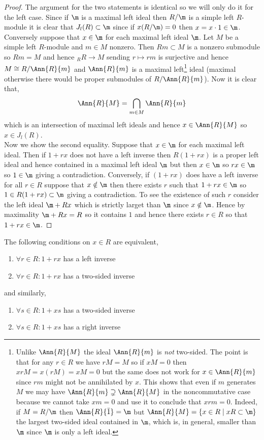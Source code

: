\documentclass[12pt]{article}
\begin{document}
\begin{proof}
The argument for the two statements is identical so we will only do it for the left case. Since if $\m$ is a maximal left ideal then $R/\m$ is a simple left $R$-module it is clear that $J_l(R) \subset \m$ since if $x (R / \m) = 0$ then $x = x \cdot 1 \in \m$. 
\bigskip\\
Conversely suppose that $x \in \m$ for each maximal left ideal $\m$. Let $M$ be a simple left $R$-module and $m \in M$ nonzero. Then $R m \subset M$ is a nonzero submodule so $R m = M$ and hence ${}_R R \to M$ sending $r \mapsto r m$ is surjective and hence $M \cong R / \Ann{R}{m}$ and $\Ann{R}{m}$ is a maximal left\footnote{Unlike $\Ann{R}{M}$ the ideal $\Ann{R}{m}$ is \textit{not} two-sided. The point is that for any $r \in R$ we have $r M = M$ so if $x M = 0$ then $xr M = x(rM) = x M = 0$ but the same does not work for $x \in \Ann{R}{m}$ since $r m$ might not be annihilated by $x$. This shows that even if $m$ generates $M$ we may have $\Ann{R}{m} \supsetneq \Ann{R}{M}$ in the noncommutative case because we cannot take $x m = 0$ and use it to conclude that $xrm = 0$. Indeed, if $M = R/\m$ then $\Ann{R}{\bar{1}} = \m$ but $\Ann{R}{M} = \{ x \in R \mid xR \subset \m \}$ the largest two-sided ideal contained in $\m$, which is, in general, smaller than $\m$ since $\m$ is only a left ideal.} ideal (maximal otherwise there would be proper submodules of $R / \Ann{R}{m}$). Now it is clear that,
\[ \Ann{R}{M} = \bigcap_{m \in M} \Ann{R}{m} \]
which is an intersection of maximal left ideals and hence $x \in \Ann{R}{M}$ so $x \in J_l(R)$.
\bigskip\\
Now we show the second equality. Suppose that $x \in \m$ for each maximal left ideal. Then if $1 + rx$ does not have a left inverse then $R (1 + rx)$ is a proper left ideal and hence contained in a maximal left ideal $\m$ but then $x \in \m$ so $r x \in \m$ so $1 \in \m$ giving a contradiction. Conversely, if $(1 + rx)$ does have a left inverse for all $r \in R$ suppose that $x \notin \m$ then there exists $r$ such that $1 + rx \in \m$ so $1 \in R (1 + rx) \subset \m$ giving a contradiction. To see the existence of such $r$ consider the left ideal $\m + R x$ which is strictly larget than $\m$ since $x \notin \m$. Hence by maximality $\m + R x = R$ so it contains $1$ and hence there exists $r \in R$ so that $1 + r x \in \m$.
\end{proof}

\begin{lemma}
The following conditions on $x \in R$ are equivalent,
\begin{enumerate}
\item $\forall r \in R : 1 + rx$ has a left inverse
\item $\forall r \in R : 1 + rx$ has a two-sided inverse
\end{enumerate}
and similarly,
\begin{enumerate}
\item $\forall s \in R : 1 + xs$ has a two-sided inverse
\item $\forall s \in R : 1 + xs$ has a right inverse
\end{enumerate}
\end{lemma}
\end{document}
